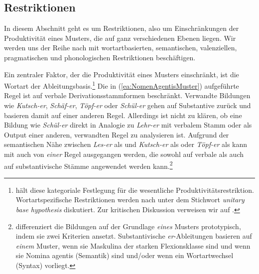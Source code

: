 \subsection{Restriktionen}\label{subsection:Restriktionen}

In diesem Abschnitt geht es um Restriktionen, also um Einschränkungen der Produktivität eines Musters, die auf ganz verschiedenen Ebenen liegen. Wir werden uns der Reihe nach mit wortartbasierten, semantischen, valenziellen, pragmatischen und phonologischen Restriktionen beschäftigen.  

Ein zentraler Faktor, der die Produktivität eines Musters einschränkt, ist die Wortart der Ableitungsbasis.\footnote{\citet[128]{Bauer2001} hält diese kategoriale Festlegung für die wesentliche Produktivitätsrestriktion. Wortartspezifische Restriktionen werden nach \citet[47--48]{Aronoff1976} unter dem Stichwort \textit{unitary base hypothesis} diskutiert. Zur kritischen Diskussion verweisen wir auf \citet[44--45]{Plank1981}.} Die in (\ref{ea:NomenAgentisMuster}) aufgeführte Regel ist auf verbale Derivationsstammformen beschränkt. Verwandte Bildungen wie \textit{Kutsch-er}, \textit{Schäf-er}, \textit{Töpf-er} oder \textit{Schül-er} gehen auf Substantive zurück und basieren damit auf einer anderen Regel. Allerdings ist nicht zu klären, ob eine Bildung wie \textit{Schül-er} direkt in Analogie zu \textit{Lehr-er} mit verbalem Stamm oder als Output einer anderen, verwandten Regel zu analysieren ist. Aufgrund der semantischen Nähe zwischen \textit{Les-er} als  und \textit{Kutsch-er} als  oder \textit{Töpf-er} als  kann mit \citet[48--49]{Scherer2005} auch von \textit{einer} Regel ausgegangen werden, die sowohl auf verbale als auch auf substantivische Stämme angewendet werden kann.\footnote{\citet[48--49]{Scherer2005} differenziert die Bildungen auf der Grundlage \textit{eines} Musters prototypisch, indem sie zwei Kriterien ansetzt. Substantivische \textit{er}-Ableitungen basieren auf \textit{einem} Muster, wenn sie Maskulina der starken Flexionsklasse sind und wenn sie Nomina agentis (Semantik) sind und/oder wenn ein Wortartwechsel (Syntax) vorliegt.}

